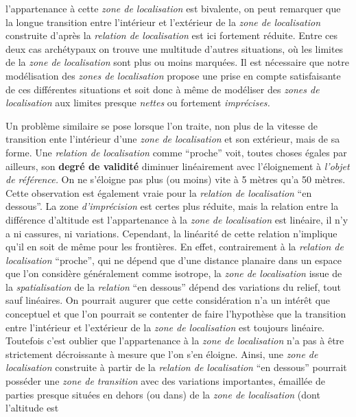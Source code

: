 l'appartenance à cette \emph{zone de localisation} est bivalente, on
peut remarquer que la longue transition entre l'intérieur et
l'extérieur de la \emph{zone de localisation} construite d'après la
\emph{relation de localisation}  est ici fortement
réduite. Entre ces deux cas archétypaux on trouve une multitude
d'autres situations, où les limites de la \emph{zone de localisation}
sont plus ou moins marquées. Il est nécessaire que notre modélisation
des \emph{zones de localisation} propose une prise en compte
satisfaisante de ces différentes situations et soit donc à même de
modéliser des \emph{zones de localisation} aux limites presque
\emph{nettes} ou fortement \emph{imprécises.}

Un problème similaire se pose lorsque l'on traite, non plus de la
vitesse de transition ente l'intérieur d'une \emph{zone de
  localisation} et son extérieur, mais de sa forme. Une \emph{relation
  de localisation} comme \enquote{proche} voit, toutes choses égales
par ailleurs, son \textbf{degré de validité} diminuer linéairement
avec l'éloignement à \emph{l'objet de référence.} On ne s'éloigne pas
plus (ou moins) vite à 5 mètres qu'a 50 mètres. Cette observation est
également vraie pour la \emph{relation de localisation} \enquote{en
  dessous}. La zone \emph{d'imprécision} est certes plus réduite, mais
la relation entre la différence d'altitude est l'appartenance à la
\emph{zone de localisation} est linéaire, il n'y a ni cassures, ni
variations. Cependant, la linéarité de cette relation n'implique qu'il
en soit de même pour les frontières. En effet, contrairement à la
\emph{relation de localisation} \enquote{proche}, qui ne dépend que
d'une distance planaire dans un espace que l'on considère généralement
comme isotrope, la \emph{zone de localisation} issue de la
\emph{spatialisation} de la \emph{relation} \enquote{en dessous}
dépend des variations du relief, tout sauf linéaires. On pourrait
augurer que cette considération n'a un intérêt que conceptuel et que
l'on pourrait se contenter de faire l'hypothèse que la transition
entre l'intérieur et l'extérieur de la \emph{zone de localisation} est
toujours linéaire. Toutefois c'est oublier que l'appartenance à la
\emph{zone de localisation} n'a pas à être strictement décroissante à
mesure que l'on s'en éloigne. Ainsi, une \emph{zone de localisation}
construite à partir de la \emph{relation de localisation} \enquote{en
  dessous} pourrait posséder une \emph{zone de transition} avec des
variations importantes, émaillée de parties presque situées en dehors
(ou dans) de la \emph{zone de localisation} (\ie dont l'altitude est
